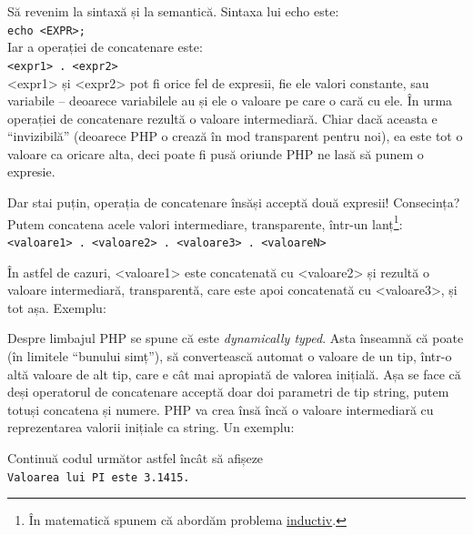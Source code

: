 Să revenim la sintaxă și la semantică. Sintaxa lui echo este:\\
\texttt{echo <EXPR>;}\\
Iar a operației de concatenare este:\\
\texttt{<expr1> . <expr2>}\\
<expr1> și <expr2> pot fi orice fel de expresii, fie ele valori constante,
sau variabile -- deoarece variabilele au și ele o valoare pe care
o cară cu ele. În urma operației de concatenare rezultă o valoare
intermediară. Chiar dacă aceasta e ``invizibilă'' (deoarece
PHP o crează în mod transparent pentru noi), ea este tot o valoare ca oricare
alta, deci poate fi pusă oriunde PHP ne lasă să punem o expresie.

Dar stai puțin, operația de concatenare însăși acceptă două expresii!
Consecința? Putem concatena acele valori intermediare, transparente,
într-un lanț\footnote{În matematică spunem că abordăm problema
\href{http://en.wikipedia.org/wiki/Structural_induction}{inductiv}.}:\\
\texttt{<valoare1> . <valoare2> . <valoare3> . <valoareN>}

În astfel de cazuri, <valoare1> este concatenată cu <valoare2> și rezultă
o valoare intermediară, transparentă, care este apoi concatenată cu <valoare3>,
și tot așa.
Exemplu:


Despre limbajul PHP se spune că este \textsl{dynamically typed}. Asta înseamnă
că poate (în limitele ``bunului simț''), să convertească automat
o valoare de un tip, într-o altă valoare de alt tip, care e cât
mai apropiată de valorea inițială. Așa se face că deși operatorul
de concatenare acceptă doar doi parametri de tip string, putem totuși
concatena și numere. PHP va crea însă încă o valoare intermediară
cu reprezentarea valorii inițiale ca string. Un exemplu:



\begin{Exercise}[title={Primul cod propriu}]
Continuă codul următor astfel încât să afișeze\\
\texttt{Valoarea lui PI este 3.1415.}

\end{Exercise}

